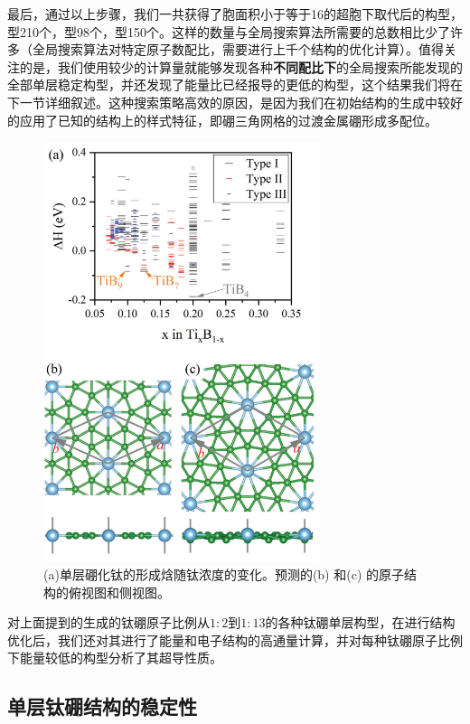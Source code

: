 最后，通过以上步骤，我们一共获得了胞面积小于等于16的超胞下取代后的构型，型\num{210}个，型\num{98}个，型\num{150}个。这样的数量与全局搜索算法所需要的总数相比少了许多（全局搜索算法对特定原子数配比，需要进行上千个结构的优化计算）。值得关注的是，我们使用较少的计算量就能够发现各种{\textbf{不同配比下}}的全局搜索所能发现的全部单层稳定构型，并还发现了能量比已经报导的更低的构型，这个结果我们将在下一节详细叙述。这种搜索策略高效的原因，是因为我们在初始结构的生成中较好的应用了已知的结构上的样式特征，即硼三角网格的过渡金属硼形成多配位。

\begin{figure}
  \includegraphics[width=0.72\textwidth]{figs/ch5_energy_hull.png}
  \centering
  \caption{(a)单层硼化钛的形成焓随钛浓度的变化。预测的(b) 和(c) 的原子结构的俯视图和侧视图。}
  \label{fig:ch5_energy_hull}
\end{figure}

对上面提到的生成的钛硼原子比例从$1:2$到$1:13$的各种钛硼单层构型，在进行结构优化后，我们还对其进行了能量和电子结构的高通量计算，并对每种钛硼原子比例下能量较低的构型分析了其超导性质。

\subsection{单层钛硼结构的稳定性}

